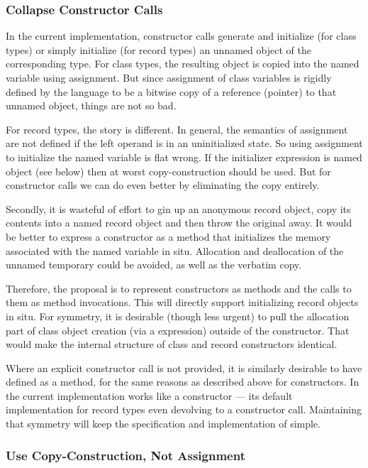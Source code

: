 \subsubsection{Collapse Constructor Calls}

In the current implementation, constructor calls generate and initialize (for class types)
or simply initialize (for record types) an unnamed object of the corresponding type.  
For class types, the resulting object is copied into the named variable using assignment.
But since assignment of class variables is rigidly defined by the language to be a bitwise
copy of a reference (pointer) to that unnamed object, things are not so bad.  

For record types, the story is different.  In general, the semantics of assignment are not
defined if the left operand is in an uninitialized state.  So using assignment to
initialize the named variable is flat wrong.  If the initializer expression is named
object (see below) then at worst copy-construction should be used.  But for constructor
calls we can do even better by eliminating the copy entirely.

Secondly, it is wasteful of effort to gin up
an anonymous record object, copy its contents into a named record object and then throw
the original away.  It would be better to express a constructor as a method that
initializes the memory associated with the named variable in situ.  Allocation and
deallocation of the unnamed temporary could be avoided, as well as the verbatim copy.

Therefore, the proposal is to represent constructors as methods and the calls to them as
method invocations.  This will directly support initializing record objects in situ.  For
symmetry, it is desirable (though less urgent) to pull the allocation part of class
object creation (via a  expression) outside of the constructor.  That would make
the internal structure of class and record constructors identical.  

Where an explicit constructor call is not provided, it is similarly desirable to have
 defined as a method, for the same reasons as described above for
constructors.  In the current implementation  works like a constructor
--- its default implementation for record types even devolving to a constructor call.
Maintaining that symmetry will keep the specification and implementation of
 simple.

\subsubsection{Use Copy-Construction, Not Assignment}

